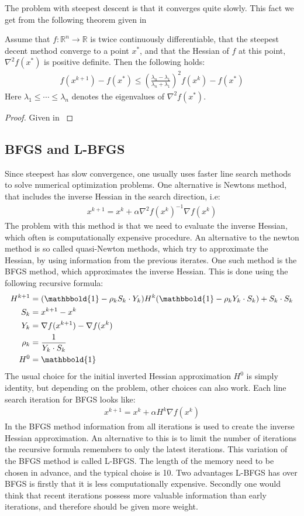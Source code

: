 The problem with steepest descent is that it converges quite slowly. This fact we get from the following theorem given in \cite{nocedal2006numerical}
\begin{theorem}
Assume that $f:\mathbb{R}^n\longrightarrow\mathbb{R}$ is twice continuously differentiable, that the steepest decent method converge to a point $x^*$, and that the Hessian of $f$ at this point, $\nabla^2 f(x^*)$ is positive definite. Then the following holds:
\begin{align*}
f(x^{k+1})-f(x^*) \leq (\frac{\lambda_n-\lambda_1}{\lambda_n+\lambda_1})^2 f(x^{k})-f(x^*)
\end{align*}  
Here $\lambda_1\leq\cdots\leq \lambda_n$ denotes the eigenvalues of $\nabla^2 f(x^*)$.
\end{theorem}   
\begin{proof}
Given in \cite{nocedal2006numerical}
\end{proof}
\subsection{BFGS and L-BFGS}
Since steepest has slow convergence, one usually uses faster line search methods to solve numerical optimization problems. One alternative is Newtons method, that includes the inverse Hessian in the search direction, i.e:
\begin{align*}
x^{k+1} = x^k + \alpha \nabla^2 f(x^k)^{-1}\nabla f(x^k)
\end{align*}
The problem with this method is that we need to evaluate the inverse Hessian, which often is computationally expensive procedure. An alternative to the newton method is so called quasi-Newton methods, which try to approximate the Hessian, by using information from the previous iterates. One such method is the BFGS method, which approximates the inverse Hessian. This is done using the following recursive formula:
\begin{align*}
H^{k+1} &= (\mathbbold{1}-\rho_kS_k\cdot Y_k)H^k(\mathbbold{1} -\rho_kY_k\cdot S_k) + S_k\cdot S_k \\
S_k &= x^{k+1}-x^{k} \\
Y_k &= \nabla f(x^{k+1})-\nabla f(x^{k})\\
\rho_k &= \frac{1}{Y_k\cdot S_k} \\
H^0&=\mathbbold{1}
\end{align*}
The usual choice for the initial inverted Hessian approximation $H^0$ is simply identity, but depending on the problem, other choices can also work. Each line search iteration for BFGS looks like:
\begin{align*}
x^{k+1} = x^k + \alpha H^{k}\nabla f(x^k)
\end{align*} 
In the BFGS method information from all iterations is used to create the inverse Hessian approximation. An alternative to this is to limit the number of iterations the recursive formula remembers to only the latest iterations. This variation of the BFGS method is called L-BFGS. The length of the memory need to be chosen in advance, and the typical choise is 10. Two advantages L-BFGS has over BFGS is firstly that it is less computationally expensive. Secondly one would think that recent iterations possess more valuable information than early iterations, and therefore should be given more weight. 
